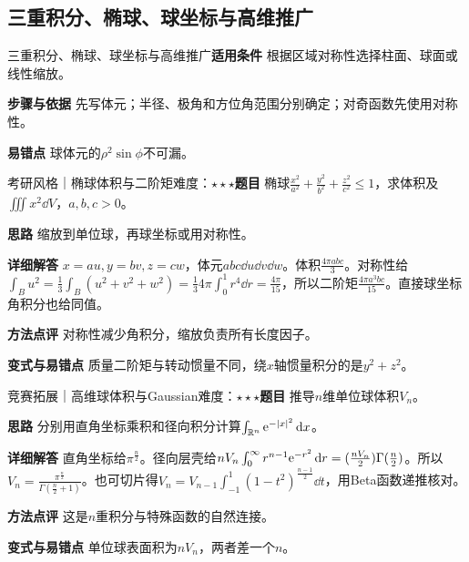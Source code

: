 \subsection{三重积分、椭球、球坐标与高维推广}\label{deep:multiple_source_deep:coordinates}

\begin{method}{三重积分、椭球、球坐标与高维推广}\textbf{适用条件} 根据区域对称性选择柱面、球面或线性缩放。\par\textbf{步骤与依据} 先写体元；半径、极角和方位角范围分别确定；对奇函数先使用对称性。\par\textbf{易错点} 球体元的$\rho^2\sin\phi$不可漏。\end{method}

\begin{example}{考研风格｜椭球体积与二阶矩}{难度：$\star\star\star$}\label{deep:ex:multiple_source_deep:ellipsoid}\textbf{题目} 椭球$\frac{x^2}{a^2}+\frac{y^2}{b^2}+\frac{z^2}{c^2}\le1$，求体积及$\iiint x^2\dd V$，$a,b,c>0$。\par\textbf{思路} 缩放到单位球，再球坐标或用对称性。\par\textbf{详细解答} $x=au,y=bv,z=cw$，体元$abc\dd u\dd v\dd w$。体积$\frac{4\pi abc}{3}$。对称性给$\int_Bu^2=\frac13\int_B(u^2+v^2+w^2)=\frac13 4\pi\int_0^1r^4\dd r=\frac{4\pi}{15}$，所以二阶矩$\frac{4\pi a^3bc}{15}$。直接球坐标角积分也给同值。\par\textbf{方法点评} 对称性减少角积分，缩放负责所有长度因子。\par\textbf{变式与易错点} 质量二阶矩与转动惯量不同，绕$x$轴惯量积分的是$y^2+z^2$。\end{example}

\begin{example}{竞赛拓展｜高维球体积与Gaussian}{难度：$\star\star\star$}\label{deep:ex:multiple_source_deep:nball}\textbf{题目} 推导$n$维单位球体积$V_n$。\par\textbf{思路} 分别用直角坐标乘积和径向积分计算$\int_{\mathbb{R}^n}\mathrm{e}^{-|x|^2}\mathop{}\!\mathrm{d} x$。\par\textbf{详细解答} 直角坐标给$\pi^{\frac{n}{2}}$。径向层壳给$nV_n\int_0^\infty r^{n-1}\mathrm{e}^{-r^2}\mathop{}\!\mathrm{d} r=(\frac{nV_n}{2})\Gamma(\frac{n}{2})$。所以$V_n=\frac{\pi^{\frac{n}{2}}}{\Gamma(\frac{n}{2}+1)}$。也可切片得$V_n=V_{n-1}\int_{-1}^1(1-t^2)^{\frac{n-1}{2}}\dd t$，用Beta函数递推核对。\par\textbf{方法点评} 这是$n$重积分与特殊函数的自然连接。\par\textbf{变式与易错点} 单位球表面积为$nV_n$，两者差一个$n$。\end{example}

